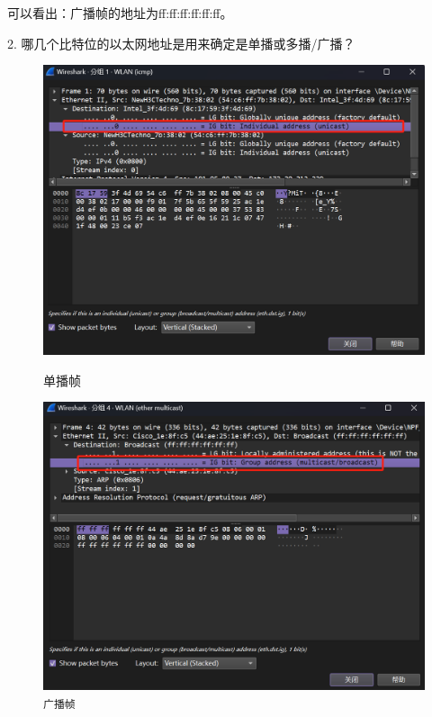 \documentclass{article}
\begin{document}
	可以看出：广播帧的地址为ff:ff:ff:ff:ff:ff。
	
	2. 哪几个比特位的以太网地址是用来确定是单播或多播/广播？
	
	\begin{figure}[H]
		\centering
		\begin{minipage}[b]{0.45\textwidth}
			\includegraphics[width=\textwidth]{images/18.单播帧.png}
			\caption{单播帧}
		\end{minipage}
		\hfill
		\begin{minipage}[b]{0.45\textwidth}
			\includegraphics[width=\textwidth]{images/19.广播帧.png}
			\caption{\texttt{广播帧}}
		\end{minipage}
	\end{figure}
	
\end{document}
